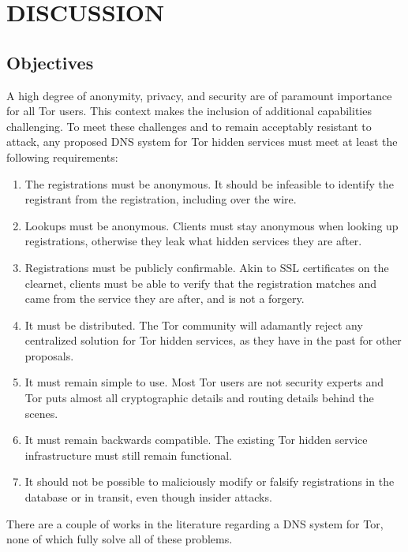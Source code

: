 \chapter{\uppercase{DISCUSSION}}
\thispagestyle{empty}

\section{Objectives}

A high degree of anonymity, privacy, and security are of paramount importance for all Tor users. This context makes the inclusion of additional capabilities challenging. To meet these challenges and to remain acceptably resistant to attack, any proposed DNS system for Tor hidden services must meet at least the following requirements: %

\begin{enumerate}
	\item The registrations must be anonymous. It should be infeasible to identify the registrant from the registration, including over the wire.
	\item Lookups must be anonymous. Clients must stay anonymous when looking up registrations, otherwise they leak what hidden services they are after.
	\item Registrations must be publicly confirmable. Akin to SSL certificates on the clearnet, clients must be able to verify that the registration matches and came from the service they are after, and is not a forgery.
	\item It must be distributed. The Tor community will adamantly reject any centralized solution for Tor hidden services, as they have in the past for other proposals.
	\item It must remain simple to use. Most Tor users are not security experts and Tor puts almost all cryptographic details and routing details behind the scenes.
	\item It must remain backwards compatible. The existing Tor hidden service infrastructure must still remain functional.
	\item It should not be possible to maliciously modify or falsify registrations in the database or in transit, even though insider attacks.
\end{enumerate}

There are a couple of works in the literature regarding a DNS system for Tor, none of which fully solve all of these problems.

